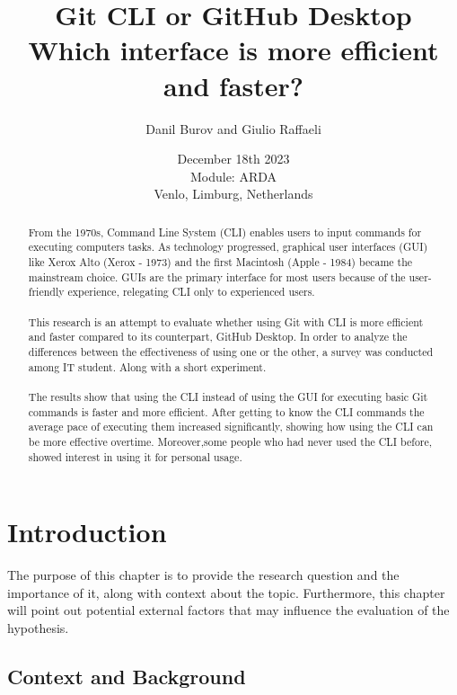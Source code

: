 \documentclass[]{report}
\title{Git CLI or GitHub Desktop \\ Which interface is more efficient and faster?}
\author{Danil Burov and Giulio Raffaeli}
\date{December 18th 2023\\Module: ARDA \\Venlo, Limburg, Netherlands}
\begin{document}
	
	\maketitle
	
	\begin{abstract}
		From the 1970s, Command Line System (CLI) enables users to input commands for executing computers tasks. As technology progressed, graphical user interfaces (GUI) like Xerox Alto (Xerox - 1973) and the first Macintosh (Apple - 1984) became the mainstream choice. GUIs are the primary interface for most users because of the user-friendly experience, relegating CLI only to experienced users.\\\\
		This research is an attempt to evaluate whether using Git with CLI is more efficient and faster compared to its counterpart, GitHub Desktop. In order to analyze the  differences between the effectiveness of using one or the other, a survey was conducted among IT student. Along with a short experiment.\\\\		
		The results show that using the CLI instead of using the GUI for executing basic Git commands is faster and more efficient.   After getting to know the CLI commands the average pace of executing them increased significantly, showing how using the CLI can be more effective overtime. Moreover,some people who had never used the CLI before, showed interest in using it for personal usage.
		
	\end{abstract}
	\tableofcontents
	\setcounter{page}{3}
	\listoffigures %
	\pagebreak
	
	
	\section{Introduction}
	The purpose of this chapter is to provide the research question and the importance of it, along with context about the topic. Furthermore, this chapter will point out potential external factors that may influence the evaluation of the hypothesis. \\
	\subsection{Context and Background}
\end{document}
